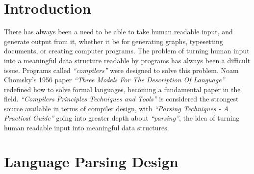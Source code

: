 \section{Introduction}
There has always been a need to be able to take human readable input, and generate output from it, whether it be for generating graphs, typesetting documents, or creating computer programs. The problem of turning human input into a meaningful data structure readable by programs has always been a difficult issue. Programs called \textit{``compilers''} were designed to solve this problem. Noam Chomsky's 1956 paper \textit{``Three Models For The Description Of Language''} redefined how to solve formal languages, becoming a fundamental paper in the field. \textit{``Compilers Principles Techniques and Tools''} is considered the strongest source available in terms of compiler design, with \textit{``Parsing Techniques - A Practical Guide''} going into greater depth about \textit{``parsing''}, the idea of turning human readable input into meaningful data structures.

\newpage
\section{Language Parsing Design}

